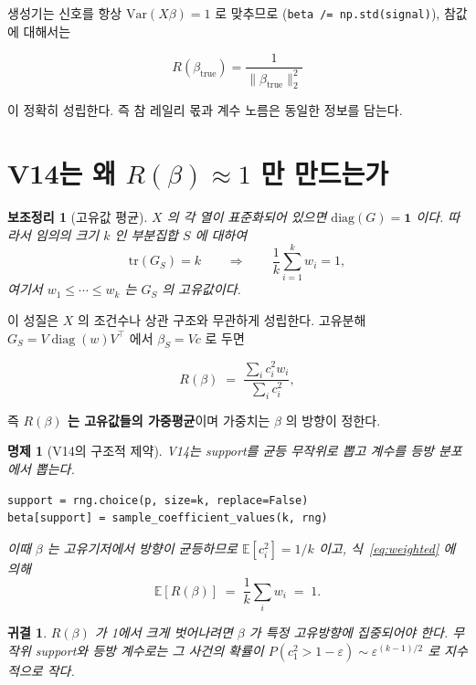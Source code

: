\documentclass[11pt]{article}
\newtheorem{lemma}{보조정리}
\newtheorem{proposition}{명제}
\newtheorem{corollary}{귀결}
\newcommand{\Rq}{R(\beta)}
\begin{document}
생성기는 신호를 항상 $\mathrm{Var}(X\beta) = 1$ 로 맞추므로
(\texttt{beta /= np.std(signal)}), 참값에 대해서는

\begin{equation}
R(\beta_{\mathrm{true}}) = \frac{1}{\|\beta_{\mathrm{true}}\|_2^2}
\end{equation}

이 정확히 성립한다. 즉 참 레일리 몫과 계수 노름은 동일한 정보를 담는다.

\section{V14는 왜 $\Rq \approx 1$ 만 만드는가}

\begin{lemma}[고유값 평균]
$X$ 의 각 열이 표준화되어 있으면 $\mathrm{diag}(G) = \mathbf{1}$ 이다.
따라서 임의의 크기 $k$ 인 부분집합 $S$ 에 대하여
\[
\mathrm{tr}(G_S) = k
\qquad\Longrightarrow\qquad
\frac{1}{k}\sum_{i=1}^{k} w_i = 1,
\]
여기서 $w_1 \le \cdots \le w_k$ 는 $G_S$ 의 고유값이다.
\end{lemma}

이 성질은 $X$ 의 조건수나 상관 구조와 무관하게 성립한다.
고유분해 $G_S = V \operatorname{diag}(w) V^\top$ 에서 $\beta_S = Vc$ 로 두면

\begin{equation}
\Rq \;=\; \frac{\sum_i c_i^2 w_i}{\sum_i c_i^2},
\label{eq:weighted}
\end{equation}

즉 \textbf{$\Rq$ 는 고유값들의 가중평균}이며 가중치는 $\beta$ 의 방향이 정한다.

\begin{proposition}[V14의 구조적 제약]
V14는 support를 균등 무작위로 뽑고 계수를 등방 분포에서 뽑는다.
\begin{verbatim}
support = rng.choice(p, size=k, replace=False)
beta[support] = sample_coefficient_values(k, rng)
\end{verbatim}
이때 $\beta$ 는 고유기저에서 방향이 균등하므로
$\mathbb{E}[c_i^2] = 1/k$ 이고, 식~\eqref{eq:weighted} 에 의해
\[
\mathbb{E}[\Rq] \;=\; \frac{1}{k}\sum_i w_i \;=\; 1 .
\]
\end{proposition}

\begin{corollary}
$\Rq$ 가 1에서 크게 벗어나려면 $\beta$ 가 특정 고유방향에 집중되어야 한다.
무작위 support와 등방 계수로는 그 사건의 확률이
$P(c_1^2 > 1-\varepsilon) \sim \varepsilon^{(k-1)/2}$ 로 지수적으로 작다.
\end{corollary}
\end{document}
